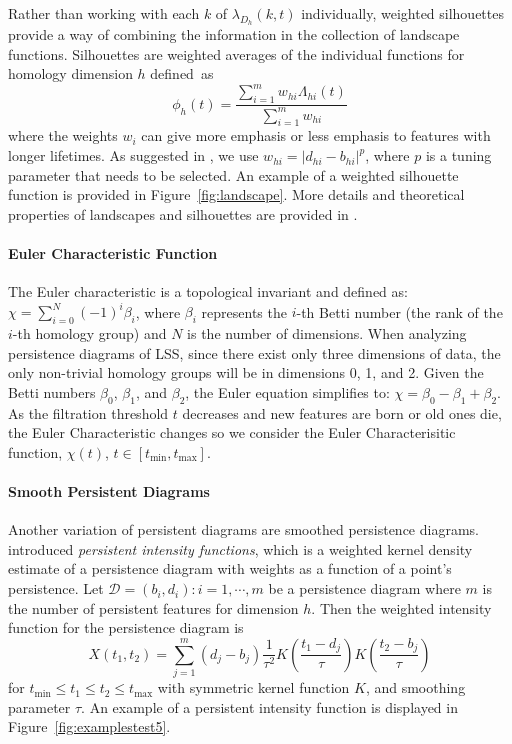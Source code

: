 \documentclass[12pt]{article}
\begin{document}
Rather than working with each $k$ of $\lambda_{D_h}(k, t)$ individually, weighted silhouettes provide a way of combining the information in the collection of landscape functions. Silhouettes are weighted averages of the individual functions for homology dimension $h$ defined~as
%
\begin{equation*}
\phi_h(t) = \frac{\sum_{i = 1}^mw_{hi}\Lambda_{hi}(t)}{\sum_{i = 1}^mw_{hi}}
\end{equation*}
where the weights $w_i$ can give more emphasis or less emphasis to features with longer lifetimes. As suggested in \citep{chazal2014stochastic}, we use $w_{hi} = |d_{hi} - b_{hi}|^p$, where $p$ is a tuning parameter that needs to be selected.  An example of a weighted silhouette function is provided in Figure~\ref{fig:landscape}.
More details and theoretical properties of landscapes and silhouettes are provided in \citep{chazal2014stochastic}.


\paragraph{Euler Characteristic Function}
The Euler characteristic is a topological invariant and defined as: $\chi = \sum_{i=0}^{N} (-1)^{i} \beta_{i}$,
where $\beta_{i}$ represents the $i$-th Betti number (the rank of the $i$-th homology group) and $N$ is the number of dimensions. When analyzing persistence diagrams of LSS, since there exist only three dimensions of data, the only non-trivial homology groups will be in dimensions 0, 1, and 2. Given the Betti numbers $\beta_{0}$, $\beta_{1}$, and $\beta_{2}$, the Euler equation simplifies to:
$\chi = \beta_{0} - \beta_{1} + \beta_{2}.$
As the filtration threshold $t$ decreases and new features are born or old ones die, the Euler Characteristic changes so we consider the Euler Characterisitic function, $\chi(t)$, $t \in [t_{\min}, t_{\max}]$.



\paragraph{Smooth Persistent Diagrams}
Another variation of persistent diagrams are smoothed persistence diagrams. \cite{chen2015statistical} introduced \emph{persistent intensity functions}, which is a weighted kernel density estimate of a persistence diagram with weights as a function of a point's persistence. Let $\mathcal{D} = {(b_i , d_i) : i = 1, \cdots ,m}$ be a persistence diagram where $m$ is the number of persistent features for dimension $h$.  Then the weighted intensity function for the persistence diagram is
%
\[ X(t_1, t_2) = \sum_{j=1}^m(d_{j} - b_{j})\frac{1}{\tau^{2}}K \left(\frac{t_1-d_{j}}{\tau}\right)K \left(\frac{t_2-b_{j}}{\tau}\right)\]
%
for $t_{\min} \leq t_1 \leq t_2 \leq t_{\max}$ with symmetric kernel function $K$, and smoothing parameter $\tau$.  An example of a persistent intensity function is displayed in Figure~\ref{fig:examplestest5}.
\end{document}
